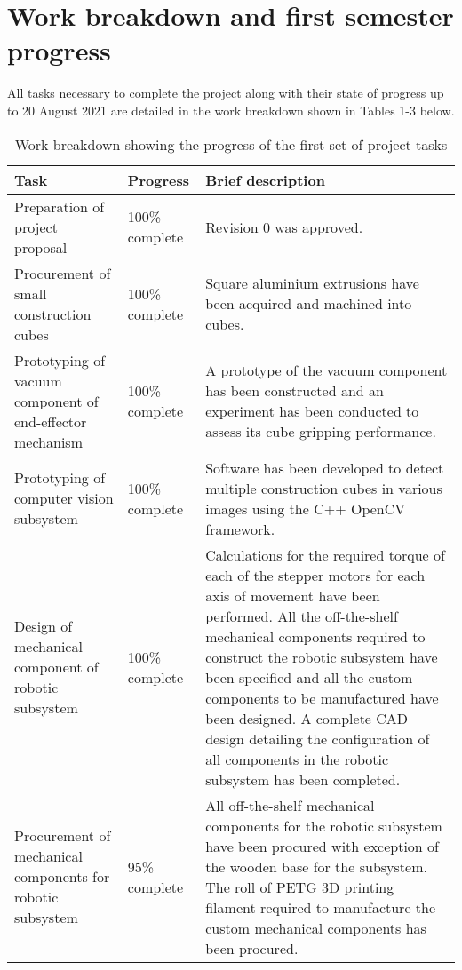
\section{Work breakdown and first semester progress}

All tasks necessary to complete the project along with their state of progress up to 20 August 2021 are detailed in the work breakdown shown in Tables 1-3 below.

\begin{table}[h]
	\centering
	\begin{tabular}{|>{\raggedright}p{4.5cm}|>{\raggedright}p{2.8cm}|>{\raggedright\arraybackslash}p{6.8cm}|}
		\hline
		\textbf{Task} & \textbf{Progress} & \textbf{Brief description} \\ \hline
		Preparation of project proposal & 100\% complete & Revision 0 was approved. \\ \hline
		Procurement of small construction cubes & 100\% complete & Square aluminium extrusions have been acquired and machined into cubes. \\ \hline
		Prototyping of vacuum component of end-effector mechanism & 100\% complete & A prototype of the vacuum component has been constructed and an experiment has been conducted to assess its cube gripping performance. \\ \hline
		Prototyping of computer vision subsystem & 100\% complete & Software has been developed to detect multiple construction cubes in various images using the C++ OpenCV framework. \\ \hline
		Design of mechanical component of robotic subsystem & 100\% complete & Calculations for the required torque of each of the stepper motors for each axis of movement have been performed. All the off-the-shelf mechanical components required to construct the robotic subsystem have been specified and all the custom components to be manufactured have been designed. A complete CAD design detailing the configuration of all components in the robotic subsystem has been completed. \\ \hline
		Procurement of mechanical components for robotic subsystem & 95\% complete & All off-the-shelf mechanical components for the robotic subsystem have been procured with exception of the wooden base for the subsystem. The roll of PETG 3D printing filament required to manufacture the custom mechanical components has been procured. \\ \hline
	\end{tabular}
	\caption{Work breakdown showing the progress of the first set of project tasks}
\end{table}

